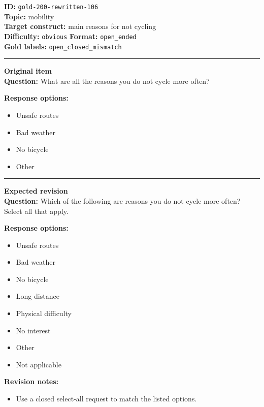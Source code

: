 \documentclass[10pt,a4paper]{article}
\newcommand{\sectionline}{\vspace{0.15em}\hrule\vspace{0.35em}}
\begin{document}
\begin{tcolorbox}[colframe=FlawRed,colback=white,colbacktitle=FlawRed!9,coltitle=black,title={Item 106\hfill Flawed item}]
\textbf{ID:} \texttt{gold-200-rewritten-106}\\
\textbf{Topic:} mobility\\
\textbf{Target construct:} main reasons for not cycling\\
\textbf{Difficulty:} \texttt{obvious} \quad \textbf{Format:} \texttt{open\_ended}\\
\textbf{Gold labels:} \texttt{open\_closed\_mismatch}\\
\sectionline
\textbf{Original item}\\
\textbf{Question:} What are all the reasons you do not cycle more often?
\par\textbf{Response options:}
\begin{itemize}
\item Unsafe routes
\item Bad weather
\item No bicycle
\item Other
\end{itemize}
\sectionline
\textbf{Expected revision}\\
\textbf{Question:} Which of the following are reasons you do not cycle more often? Select all that apply.
\par\textbf{Response options:}
\begin{itemize}
\item Unsafe routes
\item Bad weather
\item No bicycle
\item Long distance
\item Physical difficulty
\item No interest
\item Other
\item Not applicable
\end{itemize}
\par\textbf{Revision notes:}
\begin{itemize}
\item Use a closed select-all request to match the listed options.
\end{itemize}
\end{tcolorbox}
\end{document}

